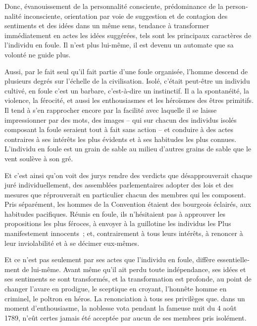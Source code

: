 \documentclass[french,twoside]{book} %
\begin{document}
Donc, évanouissement de la personnalité consciente, prédominance de la person­nalité inconsciente, orientation par voie de suggestion et de contagion des sentiments et des idées dans un même sens, tendance à transformer immédiatement en actes les idées suggérées, tels sont les principaux caractères de l’individu en foule. Il n’est plus lui-même, il est devenu un automate que sa volonté ne guide plus.\par
Aussi, par le fait seul qu’il fait partie d’une foule organisée, l’homme descend de plusieurs degrés sur l’échelle de la civilisation. Isolé, c’était peut-être un individu cultivé, en foule c’est un barbare, c’est-à-dire un instinctif. Il a la spontanéité, la violence, la férocité, et aussi les enthousiasmes et les héroïsmes des êtres primitifs. Il tend à s’en rapprocher encore par la facilité avec laquelle il se laisse impressionner par des mots, des images – qui sur chacun des individus isolés composant la foule seraient tout à fait sans action – et conduire à des actes contraires à ses intérêts les plus évidents et à ses habitudes les plus connues. L’individu en foule est un grain de sable au milieu d’autres grains de sable que le vent soulève à son gré.\par
Et c’est ainsi qu’on voit des jurys rendre des verdicts que désapprouverait chaque juré individuellement, des assemblées parlementaires adopter des lois et des mesures que réprouverait en particulier chacun des membres qui les composent. Pris séparé­ment, les hommes de la Convention étaient des bourgeois éclairés, aux habitudes pacifiques. Réunis en foule, ils n’hésitaient pas à approuver les propositions les plus féroces, à envoyer à la guillotine les individus les Plus manifestement innocents ; et, contrairement à tous leurs intérêts, à renoncer à leur inviolabilité et à se décimer eux-mêmes.\par
Et ce n’est pas seulement par ses actes que l’individu en foule, diffère essentielle­ment de lui-même. Avant même qu’il ait perdu toute indépendance, ses idées et ses sentiments se sont transformés, et la transformation est profonde, au point de changer l’avare en prodigue, le sceptique en croyant, l’honnête homme en criminel, le poltron en héros. La renonciation à tous ses privilèges que. dans un moment d’enthousiasme, la noblesse vota pendant la fameuse nuit du 4 août 1789, n’eût certes jamais été acceptée par aucun de ses membres pris isolément.\par
\end{document}
